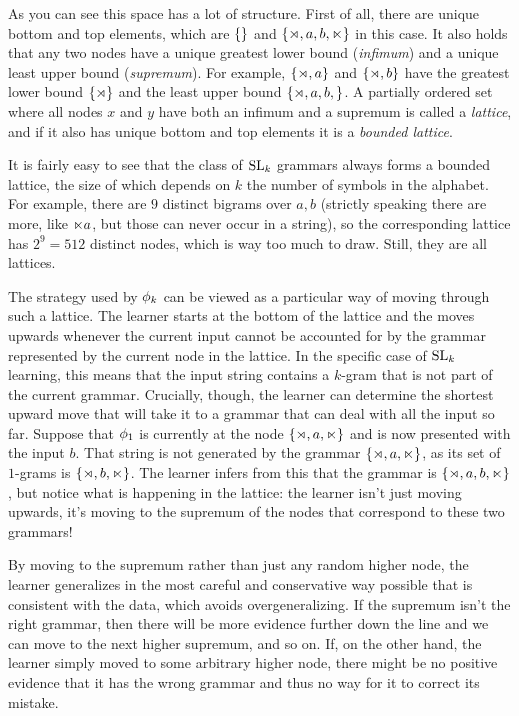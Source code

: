 As you can see this space has a lot of structure.
First of all, there are unique bottom and top elements, which are $\left \{  \right \}$ and $\left \{ \rtimes, a, b, \ltimes \right \}$ in this case.
It also holds that any two nodes have a unique greatest lower bound (\emph{infimum}) and a unique least upper bound (\emph{supremum}).
For example, $\left \{ \rtimes,a \right \}$ and $\left \{ \rtimes,b \right \}$ have the greatest lower bound $\left \{ \rtimes \right \}$ and the least upper bound $\left \{ \rtimes,a,b, \right \}$.
A partially ordered set where all nodes $x$ and $y$ have both an infimum and a supremum is called a \emph{lattice}, and if it also has unique bottom and top elements it is a \emph{bounded lattice}.

It is fairly easy to see that the class of $\mathrm{SL}_k$ grammars always forms a bounded lattice, the size of which depends on $k$ the number of symbols in the alphabet.
For example, there are $9$ distinct bigrams over $a,b$ (strictly speaking there are more, like $\ltimes a$, but those can never occur in a string), so the corresponding lattice has $2^9 = 512$ distinct nodes, which is way too much to draw.
Still, they are all lattices.

The strategy used by $\phi_k$ can be viewed as a particular way of moving through such a lattice.
The learner starts at the bottom of the lattice and the moves upwards whenever the current input cannot be accounted for by the grammar represented by the current node in the lattice.
In the specific case of $\mathrm{SL}_k$ learning, this means that the input string contains a $k$-gram that is not part of the current grammar.
Crucially, though, the learner can determine the shortest upward move that will take it to a grammar that can deal with all the input so far.
Suppose that $\phi_1$ is currently at the node $\left \{ \rtimes, a, \ltimes \right \}$ and is now presented with the input $b$.
That string is not generated by the grammar $\left \{ \rtimes, a, \ltimes \right \}$, as its set of $1$-grams is $\left \{ \rtimes, b, \ltimes \right \}$.
The learner infers from this that the grammar is $\left \{ \rtimes, a, b, \ltimes \right \}$, but notice what is happening in the lattice:
the learner isn't just moving upwards, it's moving to the supremum of the nodes that correspond to these two grammars!

By moving to the supremum rather than just any random higher node, the learner generalizes in the most careful and conservative way possible that is consistent with the data, which avoids overgeneralizing.
If the supremum isn't the right grammar, then there will be more evidence further down the line and we can move to the next higher supremum, and so on.
If, on the other hand, the learner simply moved to some arbitrary higher node, there might be no positive evidence that it has the wrong grammar and thus no way for it to correct its mistake.

